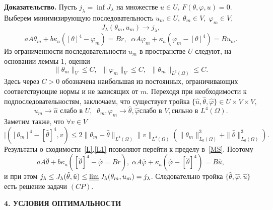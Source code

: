 \documentclass[12pt]{article}
\begin{document}
    {\bf Доказательство.}
    Пусть $j_\lambda = \inf J_\lambda$ на множестве $u \in U$, $F(\theta, \varphi, u)=0.$
    Выберем минимизирующую последовательность
    $u_m \in U, \; \theta_m \in V, \;\varphi_m\in V$, $$J_\lambda(\theta_m, u_m)
    \rightarrow j_\lambda,$$
    \begin{equation}
        \label{MS}
        a A \theta_m +b \kappa_a([\theta]^4 - \varphi_m) = Br, \;\;
        \alpha A \varphi_m + \kappa_a (\varphi_m - [\theta]^4) = B u_m.
    \end{equation}
    Из ограниченности последовательности $u_m$ в пространстве $U$ следуют, на основании
    леммы 1, оценки
    \[
        \|\theta_m\|_V \leq C,\;\;
        \|\varphi_m\|_V \leq C,\;\;\|\theta_m\|_{L^6(\Omega)} \leq C.
    \]
    Здесь через $C>0$ обозначена наибольшая из постоянных, ограничивающих соответствующие нормы и не зависящих от $m$.
    Переходя при необходимости к подпоследовательностям, заключаем, что
    существует тройка $\{ \hat{u}, \hat{\theta}, \hat{\varphi} \} \in U \times V \times V,$
    \begin{equation}
        \label{L}
        u_m \rightarrow \hat{u} \text{  слабо в } U, \;\;
        \theta_m, \varphi_m \rightarrow \hat{\theta}, \hat{\varphi} \text{
        слабо в } V, \text{
        сильно в } L^4(\Omega).
    \end{equation}
    Заметим также, что $\forall v \in V$
    \begin{equation}
        \label{L1}
        |( [\theta_m]^4 - [\hat{\theta}]^4, v)
        \leq 2 \| \theta_m - \hat{\theta}\|_{L^4(\Omega)} \|v\|_{L^4(\Omega)}
        \left( \| \theta_m \|^3_{L_6(\Omega)} + \| \hat{\theta} \|^3_{L_6(\Omega)}\right).
    \end{equation}
    Результаты о сходимости~\eqref{L},\eqref{L1} позволяют перейти
    к пределу в~\eqref{MS}.
    Поэтому
    \[
        a A \hat{\theta} + b \kappa_a ([\hat{\theta}]^4 - \hat{\varphi} = Br), \;
        \alpha A \hat{\varphi} + \kappa_a (\hat{\varphi} -[\hat{\theta}]^4) = B \hat{u},
    \]
    и при этом $j_\lambda \leq J_\lambda(\hat{\theta}, \hat{u}) \leq \varliminf J_\lambda(\theta_m, u_m) =
    j_\lambda$.
    Следовательно тройка $\{\hat{\theta}, \hat{\varphi}, \hat{u} \}$ есть
    решение задачи $(CP).$





    \begin{center}
        \textbf{4. УСЛОВИЯ ОПТИМАЛЬНОСТИ}
    \end{center}
\end{document}
